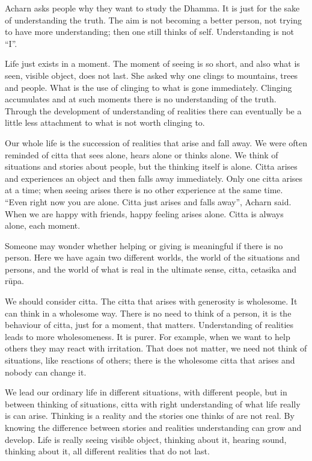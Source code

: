Acharn asks people why they want to study the Dhamma. It is just for the
sake of understanding the truth. The aim is not becoming a better
person, not trying to have more understanding; then one still thinks of
self. Understanding is not ``I''.

Life just exists in a moment. The moment of seeing is so short, and also
what is seen, visible object, does not last. She asked why one clings to
mountains, trees and people. What is the use of clinging to what is gone
immediately. Clinging accumulates and at such moments there is no
understanding of the truth. Through the development of understanding of
realities there can eventually be a little less attachment to what is
not worth clinging to.

Our whole life is the succession of realities that arise and fall away.
We were often reminded of citta that sees alone, hears alone or thinks
alone. We think of situations and stories about people, but the thinking
itself is alone. Citta arises and experiences an object and then falls
away immediately. Only one citta arises at a time; when seeing arises
there is no other experience at the same time. ``Even right now you are
alone. Citta just arises and falls away'', Acharn said. When we are
happy with friends, happy feeling arises alone. Citta is always alone,
each moment.

Someone may wonder whether helping or giving is meaningful if there is
no person. Here we have again two different worlds, the world of the
situations and persons, and the world of what is real in the ultimate
sense, citta, cetasika and rūpa.

We should consider citta. The citta that arises with generosity is
wholesome. It can think in a wholesome way. There is no need to think of
a person, it is the behaviour of citta, just for a moment, that matters.
Understanding of realities leads to more wholesomeness. It is purer. For
example, when we want to help others they may react with irritation.
That does not matter, we need not think of situations, like reactions of
others; there is the wholesome citta that arises and nobody can change
it.

We lead our ordinary life in different situations, with different
people, but in between thinking of situations, citta with right
understanding of what life really is can arise. Thinking is a reality
and the stories one thinks of are not real. By knowing the difference
between stories and realities understanding can grow and develop. Life
is really seeing visible object, thinking about it, hearing sound,
thinking about it, all different realities that do not last.

